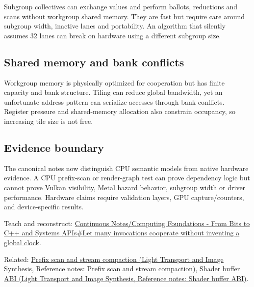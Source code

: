 Subgroup collectives can exchange values and perform ballots, reductions and scans without workgroup shared memory. They are fast but require care around subgroup width, inactive lanes and portability. An algorithm that silently assumes 32 lanes can break on hardware using a different subgroup size.

\subsection{Shared memory and bank conflicts}\label{appendix-f662b5b1773b-shared-memory-and-bank-conflicts}

Workgroup memory is physically optimized for cooperation but has finite capacity and bank structure. Tiling can reduce global bandwidth, yet an unfortunate address pattern can serialize accesses through bank conflicts. Register pressure and shared-memory allocation also constrain occupancy, so increasing tile size is not free.

\subsection{Evidence boundary}\label{appendix-f662b5b1773b-evidence-boundary}

The canonical notes now distinguish CPU semantic models from native hardware evidence. A CPU prefix-scan or render-graph test can prove dependency logic but cannot prove Vulkan visibility, Metal hazard behavior, subgroup width or driver performance. Hardware claims require validation layers, GPU capture/counters, and device-specific results.

Teach and reconstruct: \hyperref[01-foundations-i-ch008-let-many-invocations-cooperate-without-inventing-a-global-clock]{Continuous Notes/Computing Foundations - From Bits to C++ and Systems APIs\#Let many invocations cooperate without inventing a global clock}.

Related: \href{../04-Light-Transport-and-Image-Synthesis/main.pdf\#nameddest=appendix-f2ee4d086415}{Prefix scan and stream compaction (Light Transport and Image Synthesis, Reference notes: Prefix scan and stream compaction)}, \href{../04-Light-Transport-and-Image-Synthesis/main.pdf\#nameddest=appendix-749048795dbb}{Shader buffer ABI (Light Transport and Image Synthesis, Reference notes: Shader buffer ABI)}.
